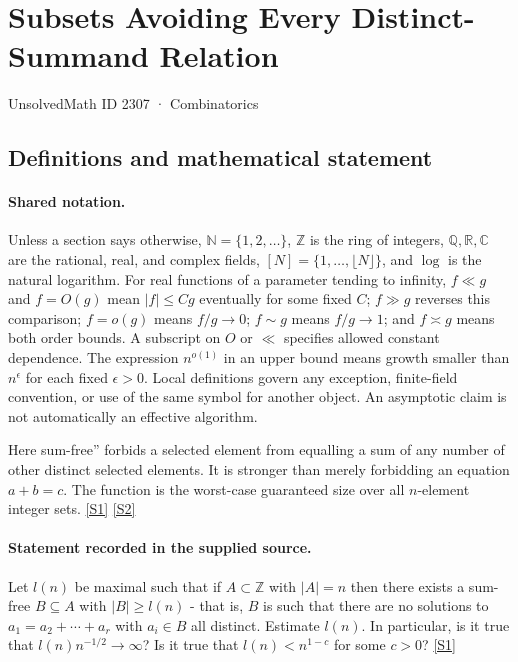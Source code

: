\documentclass[11pt,a4paper]{article}
\newcommand{\N}{\mathbb{N}}
\newcommand{\Z}{\mathbb{Z}}
\newcommand{\Q}{\mathbb{Q}}
\newcommand{\R}{\mathbb{R}}
\newcommand{\C}{\mathbb{C}}
\newcommand{\sref}[2]{\hyperlink{source:#1:#2}{[S#2]}}
\begin{document}

\setcounter{section}{2306}

\section{Subsets Avoiding Every Distinct-Summand Relation}\label{2307}

{\small\sffamily UnsolvedMath ID 2307 · Combinatorics}

\subsection{Definitions and mathematical statement}

\paragraph{Shared notation.}Unless a section says otherwise, $\N=\{1,2,\ldots\}$,
$\Z$ is the ring of integers, $\Q,\R,\C$ are the rational, real, and complex
fields, $[N]=\{1,\ldots,\lfloor N\rfloor\}$, and $\log$ is the natural
logarithm. For real functions of a parameter tending to infinity,
$f\ll g$ and $f=O(g)$ mean $|f|\leq Cg$ eventually for some fixed $C$;
$f\gg g$ reverses this comparison; $f=o(g)$ means $f/g\to0$;
$f\sim g$ means $f/g\to1$; and $f\asymp g$ means both order bounds.
A subscript on $O$ or $\ll$ specifies allowed constant dependence.
The expression $n^{o(1)}$ in an upper bound means growth smaller than
$n^\epsilon$ for each fixed $\epsilon>0$. Local definitions govern any
exception, finite-field convention, or use of the same symbol for another
object. An asymptotic claim is not automatically an effective algorithm.



Here sum-free'' forbids a selected element from equalling a sum of any number of other distinct selected elements. It is stronger than merely forbidding an equation $a+b=c$. The function is the worst-case guaranteed size over all $n$-element integer sets. \sref{2307}{1} \sref{2307}{2}

\paragraph{Statement recorded in the supplied source.}
Let $l(n)$ be maximal such that if $A\subset\mathbb{Z}$ with $\lvert A\rvert=n$ then there exists a sum-free $B\subseteq A$ with $\lvert B\rvert \geq l(n)$ - that is, $B$ is such that there are no solutions to $ a_1=a_2+\cdots+a_r $ with $a_i\in B$ all distinct.
Estimate $l(n)$. In particular, is it true that $l(n)n^{-1/2}\to \infty$? Is it true that $l(n)< n^{1-c}$ for some $c>0$? \sref{2307}{1}
\end{document}
